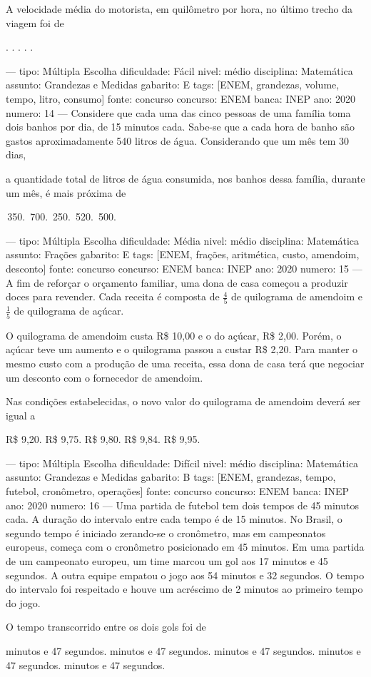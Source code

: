 A velocidade média do motorista, em quilômetro por hora, no último trecho da viagem foi de
\begin{choices}
.
.
.
.
.
\end{choices}

---
tipo: Múltipla Escolha
dificuldade: Fácil
nivel: médio
disciplina: Matemática
assunto: Grandezas e Medidas
gabarito: E
tags: [ENEM, grandezas, volume, tempo, litro, consumo]
fonte: concurso
concurso: ENEM
banca: INEP
ano: 2020
numero: 14
---
\question
Considere que cada uma das cinco pessoas de uma família toma dois banhos por dia, de 15 minutos cada. Sabe-se que a cada hora de banho são gastos aproximadamente 540 litros de água. Considerando que um mês tem 30 dias,

a quantidade total de litros de água consumida, nos banhos dessa família, durante um mês, é mais próxima de
\begin{choices}
\,350.
\,700.
\,250.
\,520.
\,500.
\end{choices}

---
tipo: Múltipla Escolha
dificuldade: Média
nivel: médio
disciplina: Matemática
assunto: Frações
gabarito: E
tags: [ENEM, frações, aritmética, custo, amendoim, desconto]
fonte: concurso
concurso: ENEM
banca: INEP
ano: 2020
numero: 15
---
\question
A fim de reforçar o orçamento familiar, uma dona de casa começou a produzir doces para revender. Cada receita é composta de $\frac{4}{5}$ de quilograma de amendoim e $\frac{1}{5}$ de quilograma de açúcar.

O quilograma de amendoim custa R\$ 10,00 e o do açúcar, R\$ 2,00. Porém, o açúcar teve um aumento e o quilograma passou a custar R\$ 2,20. Para manter o mesmo custo com a produção de uma receita, essa dona de casa terá que negociar um desconto com o fornecedor de amendoim.

Nas condições estabelecidas, o novo valor do quilograma de amendoim deverá ser igual a
\begin{choices}
\choice R\$ 9,20.
\choice R\$ 9,75.
\choice R\$ 9,80.
\choice R\$ 9,84.
\CorrectChoice R\$ 9,95.
\end{choices}

---
tipo: Múltipla Escolha
dificuldade: Difícil
nivel: médio
disciplina: Matemática
assunto: Grandezas e Medidas
gabarito: B
tags: [ENEM, grandezas, tempo, futebol, cronômetro, operações]
fonte: concurso
concurso: ENEM
banca: INEP
ano: 2020
numero: 16
---
\question
Uma partida de futebol tem dois tempos de 45 minutos cada. A duração do intervalo entre cada tempo é de 15 minutos. No Brasil, o segundo tempo é iniciado zerando-se o cronômetro, mas em campeonatos europeus, começa com o cronômetro posicionado em 45 minutos. Em uma partida de um campeonato europeu, um time marcou um gol aos 17 minutos e 45 segundos. A outra equipe empatou o jogo aos 54 minutos e 32 segundos. O tempo do intervalo foi respeitado e houve um acréscimo de 2 minutos ao primeiro tempo do jogo.

O tempo transcorrido entre os dois gols foi de
\begin{choices}
 minutos e 47 segundos.
 minutos e 47 segundos.
 minutos e 47 segundos.
 minutos e 47 segundos.
 minutos e 47 segundos.
\end{choices}
